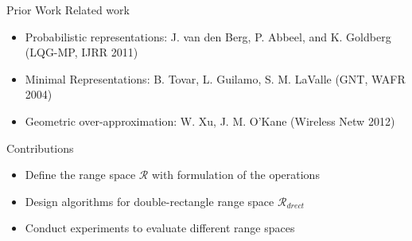\begin{frame}{Prior Work}
Related work
\begin{itemize}
\item Probabilistic representations: J. van den Berg,
  P. Abbeel, and K. Goldberg (LQG-MP, IJRR 2011)
\item Minimal Representations: B. Tovar, L. Guilamo, S. M. LaValle (GNT, WAFR 2004)
\item Geometric over-approximation: W. Xu, J. M. O'Kane (Wireless Netw 2012)
\end{itemize}
Contributions
\begin{itemize}
\item Define the range space $\mathcal{R}$ with formulation of the operations
\item Design algorithms for double-rectangle range space $\mathcal{R}_{drect}$
\item Conduct experiments to evaluate different range spaces
\end{itemize}
\end{frame}